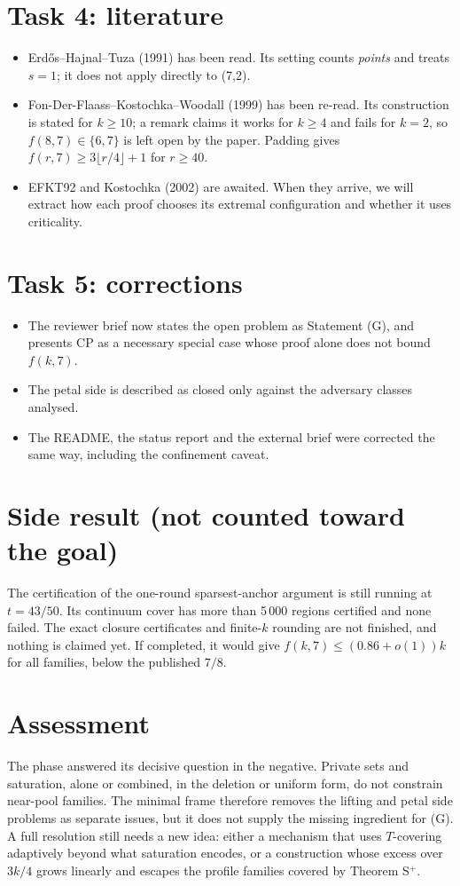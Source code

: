 \documentclass[11pt]{article}
\begin{document}
\section*{Task 4: literature}
\begin{itemize}
\item Erd\H{o}s--Hajnal--Tuza (1991) has been read. Its setting counts \emph{points} and treats $s=1$; it does not apply
directly to (7,2).
\item Fon-Der-Flaass--Kostochka--Woodall (1999) has been re-read. Its construction is stated for $k\ge10$; a remark
claims it works for $k\ge4$ and fails for $k=2$, so $f(8,7)\in\{6,7\}$ is left open by the paper. Padding gives
$f(r,7)\ge 3\lfloor r/4\rfloor+1$ for $r\ge40$.
\item EFKT92 and Kostochka (2002) are awaited. When they arrive, we will extract how each proof chooses its extremal
configuration and whether it uses criticality.
\end{itemize}

\section*{Task 5: corrections}
\begin{itemize}
\item The reviewer brief now states the open problem as Statement (G), and presents CP as a necessary special case whose
proof alone does not bound $f(k,7)$.
\item The petal side is described as closed only against the adversary classes analysed.
\item The README, the status report and the external brief were corrected the same way, including the confinement
caveat.
\end{itemize}

\section*{Side result (not counted toward the goal)}
The certification of the one-round sparsest-anchor argument is still running at $t=43/50$. Its continuum cover has more
than 5\,000 regions certified and none failed. The exact closure certificates and finite-$k$ rounding are not finished,
and nothing is claimed yet. If completed, it would give $f(k,7)\le(0.86+o(1))k$ for all families, below the published
$7/8$.

\section*{Assessment}
The phase answered its decisive question in the negative. Private sets and saturation, alone or combined, in the
deletion or uniform form, do not constrain near-pool families. The minimal frame therefore removes the lifting and petal
side problems as separate issues, but it does not supply the missing ingredient for (G). A full resolution still needs a
new idea: either a mechanism that uses $T$-covering adaptively beyond what saturation encodes, or a construction whose
excess over $3k/4$ grows linearly and escapes the profile families covered by Theorem S$^+$.
\end{document}
